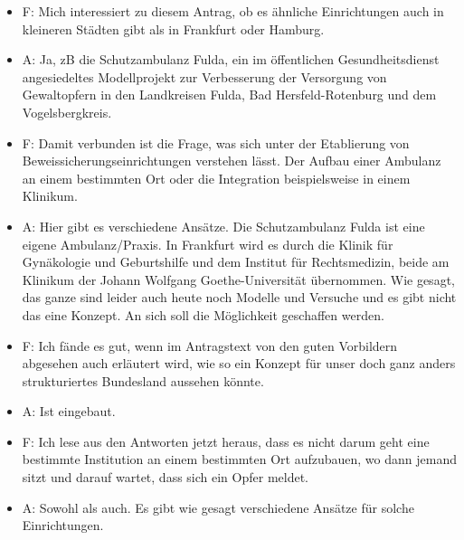 \begin{itemize}
\item
  F: Mich interessiert zu diesem Antrag, ob es ähnliche Einrichtungen auch in kleineren Städten gibt als in Frankfurt oder Hamburg.
\item
  A: Ja, zB die Schutzambulanz Fulda, ein im öffentlichen Gesundheitsdienst angesiedeltes Modellprojekt zur Verbesserung der Versorgung von Gewaltopfern in den Landkreisen Fulda, Bad Hersfeld-Rotenburg und dem Vogelsbergkreis.
\end{itemize}
\begin{itemize}
\item
  F: Damit verbunden ist die Frage, was sich unter der Etablierung von Beweissicherungseinrichtungen verstehen lässt. Der Aufbau einer Ambulanz an einem bestimmten Ort oder die Integration beispielsweise in einem Klinikum.
\item
  A: Hier gibt es verschiedene Ansätze. Die Schutzambulanz Fulda ist eine eigene Ambulanz/Praxis. In Frankfurt wird es durch die Klinik für Gynäkologie und Geburtshilfe und dem Institut für Rechtsmedizin, beide am Klinikum der Johann Wolfgang Goethe-Universität übernommen. Wie gesagt, das ganze sind leider auch heute noch Modelle und Versuche und es gibt nicht das eine Konzept. An sich soll die Möglichkeit geschaffen werden.
\end{itemize}
\begin{itemize}
\item
  F: Ich fände es gut, wenn im Antragstext von den guten Vorbildern abgesehen auch erläutert wird, wie so ein Konzept für unser doch ganz anders strukturiertes Bundesland aussehen könnte.
\item
  A: Ist eingebaut.
\end{itemize}
\begin{itemize}
\item
  F: Ich lese aus den Antworten jetzt heraus, dass es nicht darum geht eine bestimmte Institution an einem bestimmten Ort aufzubauen, wo dann jemand sitzt und darauf wartet, dass sich ein Opfer meldet.
\item
  A: Sowohl als auch. Es gibt wie gesagt verschiedene Ansätze für solche Einrichtungen.
\end{itemize}

